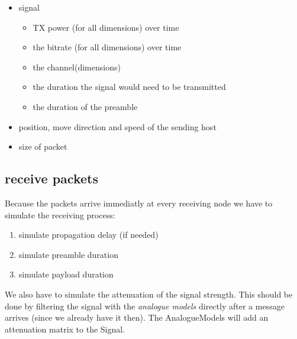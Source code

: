\begin{itemize}
\item signal
	\begin{itemize}
	\item TX power (for all dimensions) over time
	\item the bitrate (for all dimensions) over time 
	\item the channel(dimensions)
	\item the duration the signal would need to be transmitted
	\item the duration of the preamble
	
	\end{itemize}
\item position, move direction and speed of the sending host
\item size of packet
\end{itemize}

\subsection{receive packets}
\label{receivePackets}

Because the packets arrive immediatly at every receiving node we have to simulate the receiving process:

\begin{enumerate}
\item simulate propagation delay (if needed)
\item simulate preamble duration
\item simulate payload duration
\end{enumerate}

We also have to simulate the attenuation of the signal strength. This should be done by filtering the signal with the \textit{analogue models} directly after a message arrives (since we already have it then). The AnalogueModels will add an attenuation matrix to the Signal.\\


